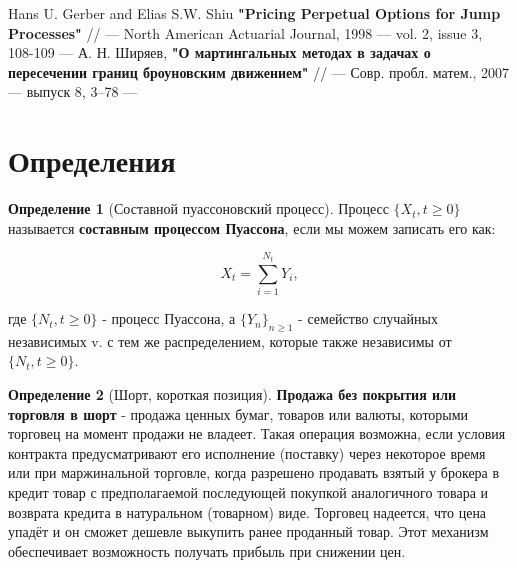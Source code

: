 \documentclass[a4paper,12pt]{article}
\theoremstyle{definition}
\newtheorem{definition}{Определение}[section]
\begin{document}
\begin{thebibliography}{3}
Hans U. Gerber and Elias S.W. Shiu \textbf{"Pricing Perpetual Options for Jump Processes"} // --- North American Actuarial Journal, 1998 --- vol. 2, issue 3, 108-109 ---
А. Н. Ширяев, \textbf{"О мартингальных методах в задачах о пересечении границ броуновским движением"} // --- Совр. пробл. матем., 2007 --- выпуск 8, 3–78 ---
\end{thebibliography}

\appendix
\section{Определения}
\begin{definition}[Составной пуассоновский процесс]
    \label{def:compound_poisson}
    Процесс $\{X_t, t \ge 0\}$ называется \textbf{составным процессом Пуассона}, если мы можем записать его как:
    
    \begin{equation}
        X_t = \sum_{i=1}^{N_t} Y_i,
    \end{equation}
    
    где $\{N_t, t \ge 0\}$ - процесс Пуассона, а $\{Y_n\}_{n \ge 1}$ - семейство случайных независимых v. с тем же распределением, которые также независимы от $\{N_t, t \ge 0\}$.
\end{definition}
\begin{definition}[Шорт, короткая позиция]
    \label{def:short_position}
    \textbf{Продажа без покрытия или торговля в шорт} - продажа ценных бумаг, товаров или валюты, которыми торговец на момент продажи не владеет. Такая операция возможна, если условия контракта предусматривают его исполнение (поставку) через некоторое время или при маржинальной торговле, когда разрешено продавать взятый у брокера в кредит товар с предполагаемой последующей покупкой аналогичного товара и возврата кредита в натуральном (товарном) виде. Торговец надеется, что цена упадёт и он сможет дешевле выкупить ранее проданный товар. Этот механизм обеспечивает возможность получать прибыль при снижении цен.
\end{definition}
\end{document}

